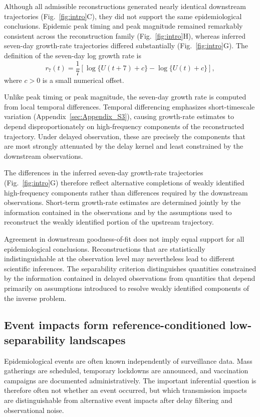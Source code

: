 Although all admissible reconstructions generated nearly identical downstream trajectories (Fig.~\ref{fig:intro}C), they did not support the same epidemiological conclusions. Epidemic peak timing and peak magnitude remained remarkably consistent across the reconstruction family (Fig.~\ref{fig:intro}H), whereas inferred seven-day growth-rate trajectories differed substantially (Fig.~\ref{fig:intro}G). The definition of the seven-day log growth rate is
\begin{equation}
r_7(t)
=
\frac{1}{7}
\left[
\log\{U(t+7)+c\}
-
\log\{U(t)+c\}
\right],
\end{equation}
where \(c>0\) is a small numerical offset. 

Unlike peak timing or peak magnitude, the seven-day growth rate is computed from local temporal differences. Temporal differencing emphasizes short-timescale variation (Appendix~\ref{sec:Appendix_S3}), causing growth-rate estimates to depend disproportionately on high-frequency components of the reconstructed trajectory. Under delayed observation, these are precisely the components that are most strongly attenuated by the delay kernel and least constrained by the downstream observations.


The differences in the inferred seven-day growth-rate trajectories (Fig.~\ref{fig:intro}G) therefore reflect alternative completions of weakly identified high-frequency components rather than differences required by the downstream observations. Short-term growth-rate estimates are determined jointly by the information contained in the observations and by the assumptions used to reconstruct the weakly identified portion of the upstream trajectory.


Agreement in downstream goodness-of-fit does not imply equal support for all epidemiological conclusions. Reconstructions that are statistically indistinguishable at the observation level may nevertheless lead to different scientific inferences. The separability criterion distinguishes quantities constrained by the information contained in delayed observations from quantities that depend primarily on assumptions introduced to resolve weakly identified components of the inverse problem.

\subsection*{Event impacts form reference-conditioned low-separability landscapes}

Epidemiological events are often known independently of surveillance data. Mass gatherings are scheduled, temporary lockdowns are announced, and vaccination campaigns are documented administratively. The important inferential question is therefore often not whether an event occurred, but which transmission impacts are distinguishable from alternative event impacts after delay filtering and observational noise.

